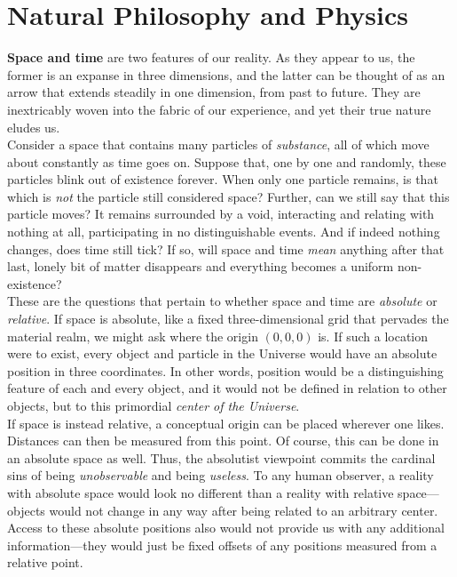 

\toclineskip
\section{Natural Philosophy and Physics}

\textbf{Space and time} are two features of our reality. As they appear to us, the former is an expanse in three dimensions, and the latter can be thought of as an arrow that extends steadily in one dimension, from past to future. They are inextricably woven into the fabric of our experience, and yet their true nature eludes us. \\

Consider a space that contains many particles of \textit{substance}, all of which move about constantly as time goes on. Suppose that, one by one and randomly, these particles blink out of existence forever. When only one particle remains, is that which is \textit{not} the particle still considered space? Further, can we still say that this particle moves? It remains surrounded by a void, interacting and relating with nothing at all, participating in no distinguishable events. And if indeed nothing changes, does time still tick? If so, will space and time \textit{mean} anything after that last, lonely bit of matter disappears and everything becomes a uniform non-existence? \\

These are the questions that pertain to whether space and time are \textit{absolute} or \textit{relative}. If space is absolute, like a fixed three-dimensional grid that pervades the material realm, we might ask where the origin $(0,0,0)$ is. If such a location were to exist, every object and particle in the Universe would have an absolute position in three coordinates. In other words, position would be a distinguishing feature of each and every object, and it would not be defined in relation to other objects, but to this primordial \textit{center of the Universe}. \\

If space is instead relative, a conceptual origin can be placed wherever one likes. Distances can then be measured from this point. Of course, this can be done in an absolute space as well. Thus, the absolutist viewpoint commits the cardinal sins of being \textit{unobservable} and being \textit{useless}. To any human observer, a reality with absolute space would look no different than a reality with relative space---objects would not change in any way after being related to an arbitrary center. Access to these absolute positions also would not provide us with any additional information---they would just be fixed offsets of any positions measured from a relative point. \\

